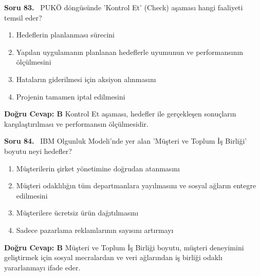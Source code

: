\documentclass[11pt,a4paper,openany]{book}
\begin{document}
\needspace{5cm}
\vspace{8pt}
\noindent\textbf{\large\sffamily Soru 83.} \ PUKÖ döngüsünde 'Kontrol Et' (Check) aşaması hangi faaliyeti temsil eder?
\begin{enumerate}[label=\Alph*), leftmargin=25pt, topsep=4pt, itemsep=2pt]
    \item Hedeflerin planlanması sürecini
    \item Yapılan uygulamanın planlanan hedeflerle uyumunun ve performansının ölçülmesini
    \item Hataların giderilmesi için aksiyon alınmasını
    \item Projenin tamamen iptal edilmesini
\end{enumerate}
\vspace{4pt}
\begin{tcolorbox}[title=Cevap ve Açıklama, colback=gray!3!white, colframe=primarycolor!90!black, arc=2mm, fonttitle=\bfseries\sffamily, top=6pt, bottom=6pt]
    \textbf{Doğru Cevap: B}
    \vspace{2pt}
    Kontrol Et aşaması, hedefler ile gerçekleşen sonuçların karşılaştırılması ve performansın ölçülmesidir.
\end{tcolorbox}
\vspace{10pt}

\needspace{5cm}
\vspace{8pt}
\noindent\textbf{\large\sffamily Soru 84.} \ IBM Olgunluk Modeli'nde yer alan 'Müşteri ve Toplum İş Birliği' boyutu neyi hedefler?
\begin{enumerate}[label=\Alph*), leftmargin=25pt, topsep=4pt, itemsep=2pt]
    \item Müşterilerin şirket yönetimine doğrudan atanmasını
    \item Müşteri odaklılığın tüm departmanlara yayılmasını ve sosyal ağların entegre edilmesini
    \item Müşterilere ücretsiz ürün dağıtılmasını
    \item Sadece pazarlama reklamlarının sayısını artırmayı
\end{enumerate}
\vspace{4pt}
\begin{tcolorbox}[title=Cevap ve Açıklama, colback=gray!3!white, colframe=primarycolor!90!black, arc=2mm, fonttitle=\bfseries\sffamily, top=6pt, bottom=6pt]
    \textbf{Doğru Cevap: B}
    \vspace{2pt}
    Müşteri ve Toplum İş Birliği boyutu, müşteri deneyimini geliştirmek için sosyal mecralardan ve veri ağlarından iş birliği odaklı yararlanmayı ifade eder.
\end{tcolorbox}
\vspace{10pt}
\end{document}
